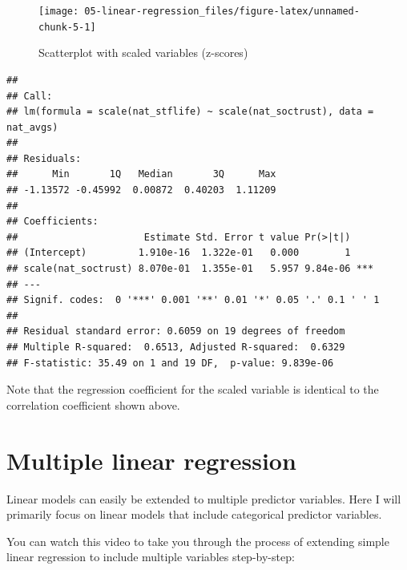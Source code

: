 \documentclass[
]{book}
\newenvironment{Shaded}{\begin{snugshade}}{\end{snugshade}}
\newcommand{\DataTypeTok}[1]{\textcolor[rgb]{0.13,0.29,0.53}{#1}}
\newcommand{\KeywordTok}[1]{\textcolor[rgb]{0.13,0.29,0.53}{\textbf{#1}}}
\newcommand{\NormalTok}[1]{#1}
\newcommand{\OperatorTok}[1]{\textcolor[rgb]{0.81,0.36,0.00}{\textbf{#1}}}
\newcommand{\StringTok}[1]{\textcolor[rgb]{0.31,0.60,0.02}{#1}}
\begin{document}
\begin{figure}

{\centering \texttt{[image: 05-linear-regression\_files/figure-latex/unnamed-chunk-5-1]} 

}

\caption{Scatterplot with scaled variables (z-scores)}\label{fig:unnamed-chunk-5}
\end{figure}

\begin{Shaded}
\end{Shaded}

\begin{verbatim}
## 
## Call:
## lm(formula = scale(nat_stflife) ~ scale(nat_soctrust), data = nat_avgs)
## 
## Residuals:
##      Min       1Q   Median       3Q      Max 
## -1.13572 -0.45992  0.00872  0.40203  1.11209 
## 
## Coefficients:
##                      Estimate Std. Error t value Pr(>|t|)    
## (Intercept)         1.910e-16  1.322e-01   0.000        1    
## scale(nat_soctrust) 8.070e-01  1.355e-01   5.957 9.84e-06 ***
## ---
## Signif. codes:  0 '***' 0.001 '**' 0.01 '*' 0.05 '.' 0.1 ' ' 1
## 
## Residual standard error: 0.6059 on 19 degrees of freedom
## Multiple R-squared:  0.6513,	Adjusted R-squared:  0.6329 
## F-statistic: 35.49 on 1 and 19 DF,  p-value: 9.839e-06
\end{verbatim}

Note that the regression coefficient for the scaled variable is
identical to the correlation coefficient shown above.

\hypertarget{multiple-linear-regression}{%
\section{Multiple linear regression}\label{multiple-linear-regression}}

Linear models can easily be extended to multiple predictor variables.
Here I will primarily focus on linear models that include categorical
predictor variables.

You can watch this video to take you through the process of extending
simple linear regression to include multiple variables step-by-step:
\end{document}
